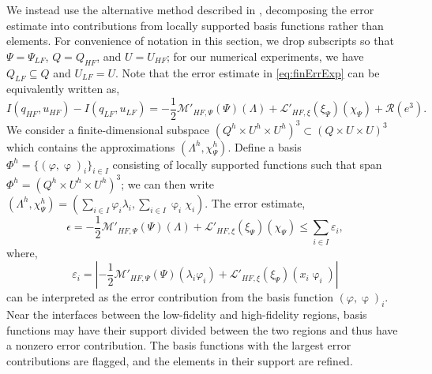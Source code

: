 We instead use the alternative method described in \cite{vanOpstaletal15}, decomposing the error estimate into contributions from locally supported basis functions rather than elements. For convenience of notation in this section, we drop subscripts so that $\Psi=\Psi_{LF}$, $Q=Q_{HF}$, and $U=U_{HF}$; for our numerical experiments, we have $Q_{LF}\subseteq Q$ and $U_{LF}=U$. Note that the error estimate in \cref{eq:finErrExp} can be equivalently written as,
%
\begin{equation}
I(q_{HF},u_{HF})-I(q_{LF},u_{LF})=-\frac{1}{2}\mathcal{M}'_{HF,\Psi}(\Psi)(\Lambda)+\mathcal{L}'_{HF,\xi}(\xi_\Psi)(\chi_\Psi)+\mathcal{R}(e^3). \nonumber
\end{equation}
%
We consider a finite-dimensional  subspace $(Q^h\times U^h\times U^h)^3 \subset (Q\times U\times U)^3$ which contains the approximations $(\Lambda^h,\chi_\Psi^h)$. Define a basis $\Phi^h=\{(\varphi,\upvarphi)_i\}_{i\in I}$ consisting of locally supported functions such that span $\Phi^h=(Q^h\times U^h\times U^h)^3$; we can then write $(\Lambda^h,\chi_\Psi^h)=(\sum\limits_{i\in I}\varphi_i\lambda_i,\sum\limits_{i\in I}\upvarphi_i \chi_i)$. The error estimate,
%
\begin{equation}
\epsilon = -\frac{1}{2}\mathcal{M}'_{HF,\Psi}(\Psi)(\Lambda)+\mathcal{L}'_{HF,\xi}(\xi_\Psi)(\chi_\Psi) \leq \sum_{i\in I} \varepsilon_i,
\end{equation}
%
where,
%
\begin{equation}\label{eq:basisblame}
\varepsilon_i = \left| -\frac{1}{2}\mathcal{M}'_{HF,\Psi}(\Psi)(\lambda_i\varphi_i)+\mathcal{L}'_{HF,\xi}(\xi_\Psi)(x_i\upvarphi_i) \right|
\end{equation}
%
can be interpreted as the error contribution from the basis function $(\varphi,\upvarphi)_i$. Near the interfaces between the low-fidelity and high-fidelity regions, basis functions may have their support divided between the two regions and thus have a nonzero error contribution. The basis functions with the largest error contributions are flagged, and the elements in their support are refined.  
